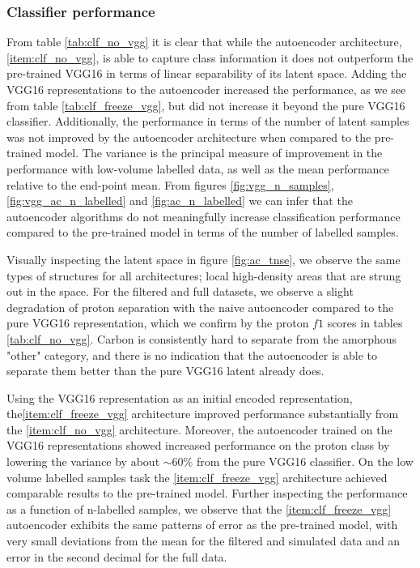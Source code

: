 \subsubsection{Classifier performance}

From table \ref{tab:clf_no_vgg} it is clear that while the autoencoder architecture, \ref{item:clf_no_vgg}, is able to capture class information it does not outperform the pre-trained VGG16 in terms of linear separability of its latent space. Adding the VGG16 representations to the autoencoder increased the performance, as we see from table \ref{tab:clf_freeze_vgg}, but did not increase it beyond the pure VGG16 classifier.  Additionally, the performance in terms of the number of latent samples was not improved by the autoencoder architecture when compared to the pre-trained model. The variance is the principal measure of improvement in the performance with low-volume labelled data, as well as the mean performance relative to the end-point mean. From figures \ref{fig:vgg_n_samples}, \ref{fig:vgg_ac_n_labelled}  and \ref{fig:ac_n_labelled} we can infer that the autoencoder algorithms do not meaningfully increase classification performance  compared to the pre-trained model in terms of the number of labelled samples.

Visually inspecting the latent space in figure \ref{fig:ac_tnse}, we observe the same types of structures for all architectures; local high-density areas that are strung out in the space. For the filtered and full datasets, we observe a slight degradation of proton separation with the naive autoencoder compared to the pure VGG16 representation, which we confirm by the proton $f1$ scores in tables \ref{tab:clf_no_vgg}. Carbon is consistently hard to separate from the amorphous "other" category, and there is no indication that the autoencoder is able to separate them better than the pure VGG16 latent already does. 

Using the VGG16 representation as an initial encoded representation, the\ref{item:clf_freeze_vgg} architecture improved performance substantially from the \ref{item:clf_no_vgg} architecture. Moreover, the autoencoder trained on the VGG16 representations showed increased performance on the proton class by lowering the variance by about $\sim 60\%$  from the pure VGG16 classifier. On the low volume labelled samples task the \ref{item:clf_freeze_vgg} architecture achieved comparable results to the pre-trained model. Further inspecting the performance as a function of n-labelled samples, we observe that the \ref{item:clf_freeze_vgg} autoencoder exhibits the same patterns of error as the pre-trained model, with very small deviations from the mean for the filtered and simulated data and an error in the second decimal for the full data.

